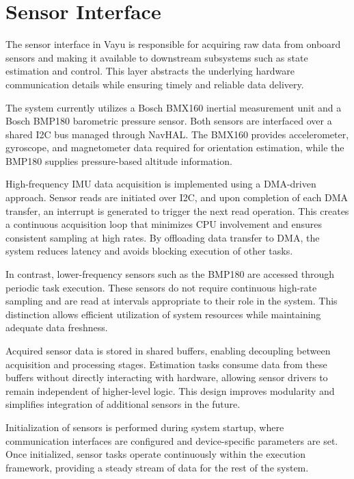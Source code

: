 \section{Sensor Interface}
\label{sec:vayu_sensor}

The sensor interface in Vayu is responsible for acquiring raw data from onboard sensors and making it available to downstream subsystems such as state estimation and control. This layer abstracts the underlying hardware communication details while ensuring timely and reliable data delivery.

The system currently utilizes a Bosch BMX160 inertial measurement unit and a Bosch BMP180 barometric pressure sensor. Both sensors are interfaced over a shared I2C bus managed through NavHAL. The BMX160 provides accelerometer, gyroscope, and magnetometer data required for orientation estimation, while the BMP180 supplies pressure-based altitude information.

High-frequency IMU data acquisition is implemented using a DMA-driven approach. Sensor reads are initiated over I2C, and upon completion of each DMA transfer, an interrupt is generated to trigger the next read operation. This creates a continuous acquisition loop that minimizes CPU involvement and ensures consistent sampling at high rates. By offloading data transfer to DMA, the system reduces latency and avoids blocking execution of other tasks.

In contrast, lower-frequency sensors such as the BMP180 are accessed through periodic task execution. These sensors do not require continuous high-rate sampling and are read at intervals appropriate to their role in the system. This distinction allows efficient utilization of system resources while maintaining adequate data freshness.

Acquired sensor data is stored in shared buffers, enabling decoupling between acquisition and processing stages. Estimation tasks consume data from these buffers without directly interacting with hardware, allowing sensor drivers to remain independent of higher-level logic. This design improves modularity and simplifies integration of additional sensors in the future.

Initialization of sensors is performed during system startup, where communication interfaces are configured and device-specific parameters are set. Once initialized, sensor tasks operate continuously within the execution framework, providing a steady stream of data for the rest of the system.
